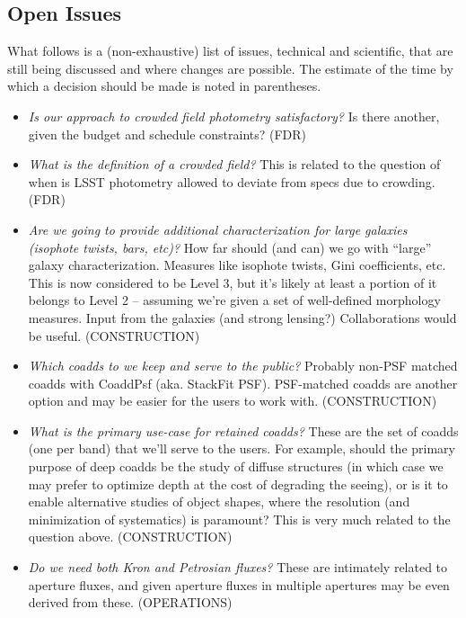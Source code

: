 \documentclass[SE,lsstdraft,toc]{lsstdoc}
\begin{document}
\begin{openissues}
\subsection{Open Issues}

What follows is a (non-exhaustive) list of issues, technical and scientific, that are still being discussed and where changes are possible. The estimate of the time by which a decision should be made is noted in parentheses.

\begin{itemize}
    \item \emph{Is our approach to crowded field photometry satisfactory?} Is there another, given the budget and schedule constraints? (FDR)

    \item \emph{What is the definition of a crowded field?} This is related to the question of when is LSST photometry allowed to deviate from \SRD specs due to crowding. (FDR)

    \item \emph{Are we going to provide additional characterization for large galaxies (isophote twists, bars, etc)?} How far should (and can) we go with ``large'' galaxy characterization. Measures like isophote twists, Gini coefficients, etc. This is now considered to be Level 3, but it's likely at least a portion of it belongs to Level 2 -- assuming we're given a set of well-defined morphology measures. Input from the galaxies (and strong lensing?) Collaborations would be useful. (CONSTRUCTION)

    \item \emph{Which coadds to we keep and serve to the public?} Probably non-PSF matched coadds with CoaddPsf (aka. StackFit PSF). PSF-matched coadds are another option and may be easier for the users to work with. (CONSTRUCTION)

    \item \emph{What is the primary use-case for retained coadds?} These are the set of coadds (one per band) that we'll serve to the users. For example, should the primary purpose of deep coadds be the study of diffuse structures (in which case we may prefer to optimize depth at the cost of degrading the seeing), or is it to enable alternative studies of object shapes, where the resolution (and minimization of systematics) is paramount? This is very much related to the question above. (CONSTRUCTION)

    \item \emph{Do we need both Kron and Petrosian fluxes?} These are intimately related to aperture fluxes, and given aperture fluxes in multiple apertures may be even derived from these. (OPERATIONS)


\end{itemize}
\end{openissues}
\end{document}
